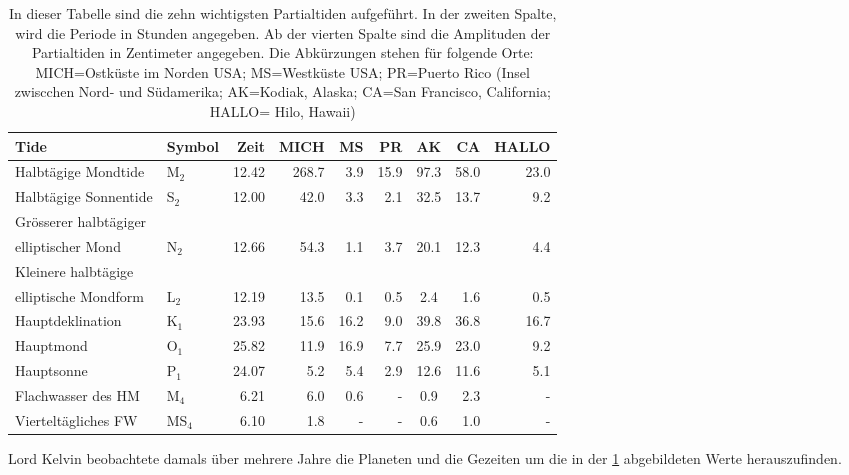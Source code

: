 \begin{table}
	\centering
	
\begin{tabular}{|l|l|r|r|r|r|c|r|r|}
	\hline
	Tide&Symbol&Zeit&MICH&MS&PR&AK&CA&HALLO\\
	\hline \hline
	Halbtägige Mondtide&M$_{2}$&12.42&268.7&3.9&15.9&97.3&58.0&23.0\\
	\hline
	Halbtägige Sonnentide&S$_{2}$&12.00&42.0&3.3&2.1&32.5&13.7&9.2\\
	\hline
	Grösserer halbtägiger&&&&&&&&\\
	elliptischer Mond&N$_{2}$&12.66&54.3&1.1&3.7&20.1&12.3&4.4\\
	\hline
	Kleinere halbtägige&&&&&&&&\\
	elliptische Mondform&L$_{2}$&12.19&13.5&0.1&0.5&2.4&1.6&0.5\\
	\hline\hline 
	Hauptdeklination&K$_{1}$&23.93&15.6&16.2&9.0&39.8&36.8&16.7\\
	\hline
	Hauptmond&O$_{1}$&25.82&11.9&16.9&7.7&25.9&23.0&9.2\\
	\hline
	Hauptsonne&P$_{1}$&24.07&5.2&5.4&2.9&12.6&11.6&5.1\\
	\hline\hline
	Flachwasser des HM&M$_{4}$&6.21&6.0&0.6&-&0.9&2.3&-\\
	\hline
	Vierteltägliches FW&MS$_{4}$&6.10&1.8&-&-&0.6&1.0&-\\
	\hline	
\end{tabular}
	
\caption{In dieser Tabelle sind die zehn wichtigsten Partialtiden aufgeführt. In der zweiten Spalte, wird die Periode in Stunden angegeben. Ab der vierten Spalte sind die Amplituden der Partialtiden in Zentimeter angegeben. Die Abkürzungen stehen für folgende Orte: MICH=Ostküste im Norden USA; MS=Westküste USA; PR=Puerto Rico (Insel zwiscchen Nord- und Südamerika; AK=Kodiak, Alaska; CA=San Francisco, California; HALLO= Hilo, Hawaii)}
\label{gezeiten:tabelle:partialtiden}
\end{table}

Lord Kelvin beobachtete damals über mehrere Jahre die Planeten und die Gezeiten um die in der \ref{gezeiten:tabelle:partialtiden} abgebildeten Werte herauszufinden. 

